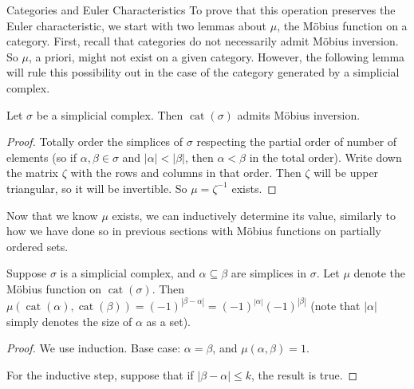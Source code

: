 \documentclass[12pt]{pom_thesis}
\DeclareMathOperator{\cat}{cat}
\begin{document}
\begin{chapter}{Categories and Euler Characteristics}
To prove that this operation preserves the Euler characteristic, we start with two lemmas about $\mu$, the M\"obius function on a category. First, recall that categories do not necessarily admit M\"obius inversion. So $\mu$, a priori, might not exist on a given category. However, the following lemma will rule this possibility out in the case of the category generated by a simplicial complex.
\begin{lemma}\label{mu_exists}
Let $\sigma$ be a simplicial complex. Then $\cat(\sigma)$ admits M\"obius inversion.
\end{lemma}
\begin{proof}
Totally order the simplices of $\sigma$ respecting the partial order of number of elements (so if $\alpha, \beta \in \sigma$ and $|\alpha| < |\beta|$, then $\alpha < \beta$ in the total order). Write down the matrix $\zeta$ with the rows and columns in that order. Then $\zeta$ will be upper triangular, so it will be invertible. So $\mu = \zeta^{-1}$ exists.
\end{proof}
Now that we know $\mu$ exists, we can inductively determine its value, similarly to how we have done so in previous sections with M\"obius functions on partially ordered sets.
\begin{lemma}
\label{mu_lemma}
Suppose $\sigma$ is a simplicial complex, and $\alpha \subseteq \beta$ are simplices in $\sigma$. Let $\mu$ denote the M\"obius function on $\cat(\sigma)$. Then $\mu(\cat(\alpha), \cat(\beta)) =(-1)^{|\beta - \alpha|} = (-1)^{|\alpha|} (-1)^{|\beta|}$ (note that $|\alpha|$ simply denotes the size of $\alpha$ as a set).
\end{lemma}
\begin{proof}
We use induction. Base case: $\alpha = \beta$, and $\mu(\alpha, \beta)=1$.

For the inductive step, suppose that if $|\beta-\alpha| \leq k$, the result is true.


\end{proof}
\end{chapter}
\end{document}
